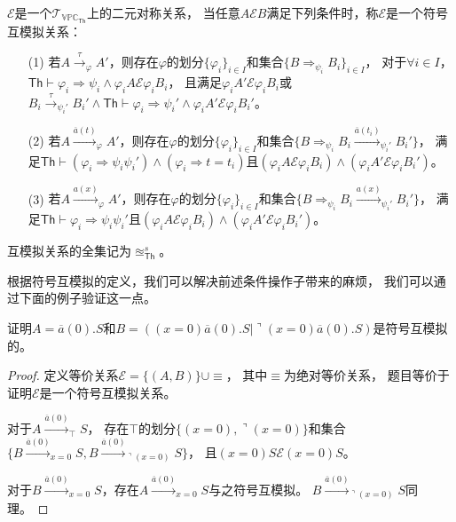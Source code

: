   \begin{definition}[符号互模拟]\label{def:symbolic_bisimulation}
      $\mathcal{E}$是一个$\mathcal{T}_{\mathbb{VPC}_{\mathsf{Th}}}$上的二元对称关系，
      当任意$A\mathcal{E}B$满足下列条件时，称$\mathcal{E}$是一个符号互模拟关系：
      \begin{itemize}
         \item[(1)] {
            若$A\stackrel{\tau}{\rightarrow}_{\varphi} A'$，则存在$\varphi$的划分$\{\varphi_i\}_{i\in I}$和集合$\{B\Rightarrow_{\psi_i} B_i\}_{i\in I}$，
            对于$\forall i\in I$，$\mathsf{Th}\vdash \varphi_i\Rightarrow \psi_i\wedge \varphi_i A\mathcal{E} \varphi_i B_i$，
            且满足$\varphi_i A'\mathcal{E} \varphi_i B_i$或$B_i\stackrel{\tau}{\rightarrow}_{\psi_i'}B_i'\wedge \mathsf{Th}\vdash \varphi_i\Rightarrow \psi_i'\wedge \varphi_i A'\mathcal{E} \varphi_i B_i'$。
         }
         \item[(2)] {
            若$A\stackrel{\overline{a}(t)}{\rightarrow}_{\varphi} A'$，则存在$\varphi$的划分$\{\varphi_i\}_{i\in I}$和集合$\{B\Rightarrow_{\psi_i}B_i\stackrel{\overline{a}(t_i)}{\rightarrow}_{\psi_i'}B_i'\}$，
            满足$\mathsf{Th}\vdash (\varphi_i\Rightarrow \psi_i\psi_i')\wedge (\varphi_i \Rightarrow t=t_i)$且$(\varphi_i A\mathcal{E}\varphi_i B_i)\wedge(\varphi_i A'\mathcal{E}\varphi_i B_i')$。
         }
         \item[(3)] {
            若$A\stackrel{a(x)}{\rightarrow}_{\varphi} A'$，则存在$\varphi$的划分$\{\varphi_i\}_{i\in I}$和集合$\{B\Rightarrow_{\psi_i}B_i\stackrel{a(x)}{\rightarrow}_{\psi_i'}B_i'\}$，
            满足$\mathsf{Th}\vdash \varphi_i\Rightarrow \psi_i\psi_i'$且$(\varphi_i A\mathcal{E}\varphi_i B_i)\wedge(\varphi_i A'\mathcal{E}\varphi_i B_i')$。
         }
      \end{itemize}
      互模拟关系的全集记为$\approxeq_{\mathsf{Th}}^s$。
   \end{definition}

   根据符号互模拟的定义，我们可以解决前述条件操作子带来的麻烦，
   我们可以通过下面的例子验证这一点。
   \begin{example}
      证明$A=\overline{a}(0).S$和$B=((x=0) \overline{a}(0).S|\urcorner (x=0) \overline{a}(0).S)$是符号互模拟的。
   \end{example}
   \begin{proof}
      定义等价关系$\mathcal{E}=\{(A,B)\}\cup \equiv$，
      其中$\equiv$为绝对等价关系，
      题目等价于证明$\mathcal{E}$是一个符号互模拟关系。

      对于$A\stackrel{\overline{a}(0)}{\rightarrow}_{\top} S$，
      存在$\top$的划分$\{(x=0),\urcorner(x=0)\}$和集合
      $\{B\stackrel{\overline{a}(0)}{\longrightarrow}_{x=0}S, B\stackrel{\overline{a}(0)}{\longrightarrow}_{\urcorner(x=0)}S\}$，
      且$(x=0)S\mathcal{E}(x=0)S$。

      对于$B\stackrel{\overline{a}(0)}{\longrightarrow}_{x=0}S$，存在$A\stackrel{\overline{a}(0)}{\longrightarrow}_{x=0}S$与之符号互模拟。
      $B\stackrel{\overline{a}(0)}{\longrightarrow}_{\urcorner(x=0)}S$同理。
   \end{proof}

